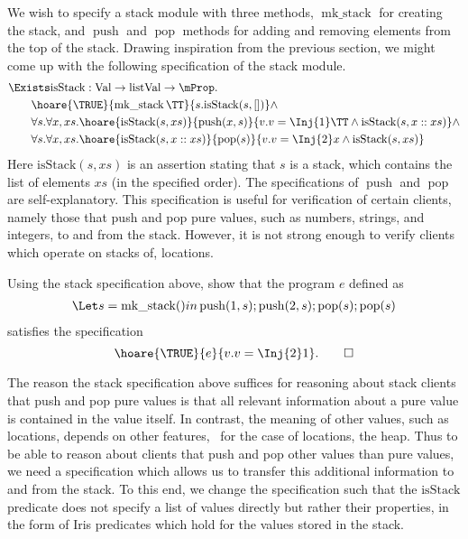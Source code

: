 We wish to specify a stack module with three methods, $\operatorname{mk\_stack}$ for creating the stack, and $\operatorname{push}$ and $\operatorname{pop}$ methods for adding and removing elements from the top of the stack.
Drawing inspiration from the previous section, we might come up with the following specification of the stack module.
\begin{align}
  \label{eq:example:simple-stack-specification}
  \begin{split}
    &\Exists \mathrm{isStack} : \Val \to \mathrm{list} \Val \to\Prop.\\
    &\qquad \hoare{\TRUE}{\operatorname{mk\_stack} \TT}{s. \mathrm{isStack}(s,[])} \land \\
    &\qquad \forall s. \forall x, xs. \hoare{\mathrm{isStack}(s,xs) }{\operatorname{push} (x,s)}{v. v = \Inj{1}\TT \land \mathrm{isStack}(s,x::xs)} \land\\
    &\qquad \forall s. \forall x, xs. \hoare{\mathrm{isStack}(s,x::xs)}{\operatorname{pop} (s)}{v. v = \Inj{2}x\land \mathrm{isStack}(s,xs)}
  \end{split}
\end{align}
Here $\mathrm{isStack}(s, xs)$ is an assertion stating that $s$ is a stack, which contains the list of elements $xs$ (in the specified order).
The specifications of $\operatorname{push}$ and $\operatorname{pop}$ are self-explanatory.
This specification is useful for verification of certain clients,
namely those that push and pop pure values, such as numbers, strings,
and integers, to and from the stack.
However, it is not strong enough to verify clients which operate on stacks of, \eg{} locations. 
\begin{exercise}
  Using the stack specification above, show that the program $e$ defined as
  \begin{align*}
    \Let s = \operatorname{mk\_stack} () in \operatorname{push}(1,s); \operatorname{push}(2,s); \operatorname{pop}(s) ; \operatorname{pop}(s)
  \end{align*}
  satisfies the specification
  \begin{displaymath}
    \hoare{\TRUE}{e}{v.v = \Inj{2}1}. \qedhere
  \end{displaymath}
\end{exercise}

The reason the stack specification above suffices for reasoning about
stack clients that push and pop pure values is that all relevant information
about a pure value is contained in the value itself.
In contrast, the meaning of other values, such as locations, depends
on other features, \eg\, for the case of locations, the heap.
Thus to be able to reason about clients that push and pop other values
than pure values, we need a specification which allows us to transfer 
this additional information to and from the stack.
To this end, we change the specification such that 
the $\mathrm{isStack}$ predicate does not specify a list of values
directly but rather their properties, in the form of Iris predicates which hold for the values stored in the stack.

